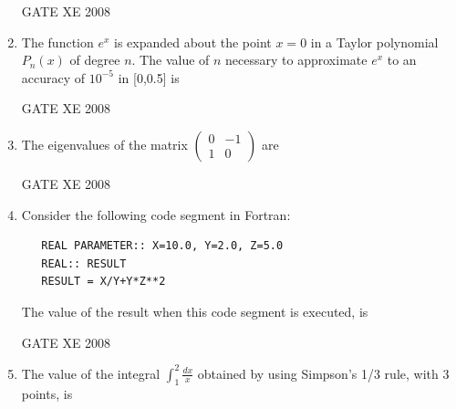 \documentclass[12pt]{article}
\begin{document}
\begin{enumerate}[label=Q\arabic*.]
GATE XE 2008
\item The function $e^x$ is expanded about the point $x=0$ in a Taylor polynomial $P_{n}(x)$ of degree $n$. The value of $n$ necessary to approximate $e^x$ to an accuracy of $10^{-5}$ in [0,0.5] is

\begin{enumerate}[label=(\Alph*)]
\end{enumerate}

GATE XE 2008
\item The eigenvalues of the matrix $\begin{pmatrix}0&-1\\1&0\end{pmatrix}$ are\newline

\begin{enumerate}[label=(\Alph*)]
\end{enumerate}

GATE XE 2008
\item  Consider the following code segment in Fortran:
\begin{verbatim}
   REAL PARAMETER:: X=10.0, Y=2.0, Z=5.0
   REAL:: RESULT
   RESULT = X/Y+Y*Z**2
\end{verbatim}
The value of the result when this code segment is executed, is

\begin{enumerate}[label=(\Alph*)]
\end{enumerate}

GATE XE 2008
\item The value of the integral $\int_{1}^{2} \frac{dx}{x}$ obtained by using Simpson's 1/3 rule, with 3 points, is


\end{enumerate}
\end{document}
